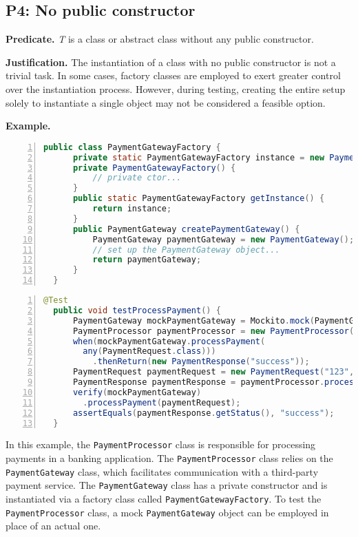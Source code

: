 \documentclass[conference]{IEEEtran}
\begin{document}
\subsection{P4: No public constructor}
\textbf{Predicate. }
\textit{T} is a class or abstract class without any public constructor. 

\textbf{Justification. }
The instantiation of a class with no public constructor is not a trivial task. In some cases, factory classes are employed to exert greater control over the instantiation process. However, during testing, creating the entire setup solely to instantiate a single object may not be considered a feasible option.

\textbf{Example. }
\begin{lstlisting}[basicstyle=\ttfamily,
numbers=left,numbersep=0pt,basicstyle=\scriptsize\ttfamily,language = Java, framesep=4.5mm, framexleftmargin=1.0mm, captionpos=b, escapechar=|, morekeywords={@Test}]
  public class PaymentGatewayFactory {
      private static PaymentGatewayFactory instance = new PaymentGatewayFactory();
      private PaymentGatewayFactory() {
          // private ctor...
      }
      public static PaymentGatewayFactory getInstance() {
          return instance;
      }
      public PaymentGateway createPaymentGateway() {
          PaymentGateway paymentGateway = new PaymentGateway();
          // set up the PaymentGateway object...
          return paymentGateway;
      }
  }
\end{lstlisting}

\begin{lstlisting}[basicstyle=\ttfamily,
numbers=left,numbersep=0pt,basicstyle=\scriptsize\ttfamily,language = Java, framesep=4.5mm, framexleftmargin=1.0mm, captionpos=b, escapechar=|, morekeywords={@Test}]
  @Test
  public void testProcessPayment() {
      PaymentGateway mockPaymentGateway = Mockito.mock(PaymentGateway.class);
      PaymentProcessor paymentProcessor = new PaymentProcessor(mockPaymentGateway);
      when(mockPaymentGateway.processPayment(
        any(PaymentRequest.class)))
          .thenReturn(new PaymentResponse("success"));
      PaymentRequest paymentRequest = new PaymentRequest("123", 100.0);
      PaymentResponse paymentResponse = paymentProcessor.processPayment(paymentRequest);
      verify(mockPaymentGateway)
        .processPayment(paymentRequest);
      assertEquals(paymentResponse.getStatus(), "success");
  }
\end{lstlisting}

In this example, the \texttt{PaymentProcessor} class is responsible for processing payments in a banking application. The \texttt{PaymentProcessor} class relies on the \texttt{PaymentGateway} class, which facilitates communication with a third-party payment service. The \texttt{PaymentGateway} class has a private constructor and is instantiated via a factory class called \texttt{PaymentGatewayFactory}. To test the \texttt{PaymentProcessor} class, a mock \texttt{PaymentGateway} object can be employed in place of an actual one.
\end{document}
